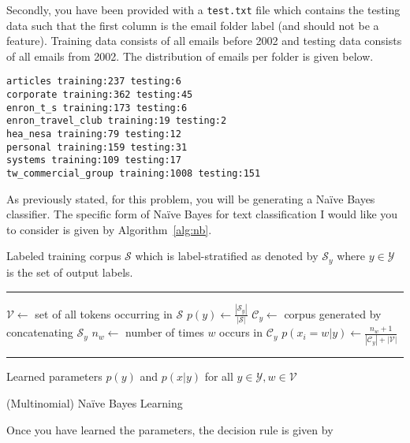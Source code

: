 \documentclass[12pt,letterpaper]{article}
\begin{document}
\begin{enumerate}
Secondly, you have been provided with a {\tt test.txt} file which contains the testing data such that the first column is the email folder label (and should not be a feature).  Training data consists of all emails before 2002 and testing data consists of all emails from 2002.  The distribution of emails per folder is given below.

\begin{verbatim}
articles training:237 testing:6
corporate training:362 testing:45
enron_t_s training:173 testing:6
enron_travel_club training:19 testing:2
hea_nesa training:79 testing:12
personal training:159 testing:31
systems training:109 testing:17
tw_commercial_group training:1008 testing:151
\end{verbatim}

As previously stated, for this problem, you will be generating a Na\"{i}ve Bayes classifier.  The specific form of Na\"{i}ve Bayes for text classification I would like you to consider is given by Algorithm~\ref{alg:nb}.

\begin{algorithm}
\begin{algorithmic}
    Labeled training corpus $\mathcal{S}$ which is label-stratified as denoted by $\mathcal{S}_y$ where $y \in \mathcal{Y}$ is the set of output labels.
   \vspace{0.5em}
   \hrule
   \vspace{0.5em}
   \STATE $\mathcal{V} \leftarrow$ set of all tokens occurring in $\mathcal{S}$ 
      \STATE $p(y) \leftarrow \frac{|\mathcal{S}_y|}{|\mathcal{S}|}$
      \STATE $\mathcal{C}_y \leftarrow$ corpus generated by concatenating $\mathcal{S}_y$
         \STATE $n_w \leftarrow$ number of times $w$ occurs in $\mathcal{C}_y$
         \STATE $p(x_i = w  | y) \leftarrow \frac{n_w + 1}{|\mathcal{C}_y| + |\mathcal{V}|}$
      \ENDFOR
   \ENDFOR
   \vspace{0.5em}
   \hrule
   \vspace{0.5em}
    Learned parameters $p(y)$ and $p(x|y)$ for all $y \in \mathcal{Y}, w \in \mathcal{V}$ 
\caption{(Multinomial) Na\"{i}ve Bayes Learning}
\label{alg:nb}
\end{algorithmic}
\end{algorithm}

Once you have learned the parameters, the decision rule is given by


\end{enumerate}
\end{document}
